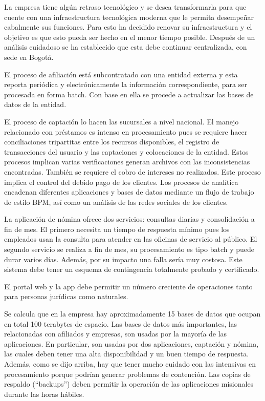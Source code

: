 \documentclass[a4paper]{article}
\begin{document}
La empresa tiene algún retraso tecnológico y se desea transformarla para que cuente con una infraestructura
tecnológica moderna que le permita desempeñar cabalmente sus funciones. Para esto ha decidido renovar su
infraestructura y el objetivo es que esto pueda ser hecho en el menor tiempo posible. Después de un análisis
cuidadoso se ha establecido que esta debe continuar centralizada, con sede en Bogotá.

El proceso de afiliación está subcontratado con una entidad externa y esta reporta periódica y electrónicamente la
información correspondiente, para ser procesada en forma batch. Con base en ella se procede a actualizar las bases
de datos de la entidad.

El proceso de captación lo hacen las sucursales a nivel nacional. El manejo relacionado con préstamos es intenso en
procesamiento pues se requiere hacer conciliaciones tripartitas entre los recursos disponibles, el registro de
transacciones del usuario y las captaciones y colocaciones de la entidad. Estos procesos implican varias verificaciones generan archivos con las inconsistencias encontradas. También se requiere el cobro de intereses no
realizados. Este proceso implica el control del debido pago de los clientes.
Los procesos de analítica encadenan diferentes aplicaciones y bases de datos mediante un flujo de trabajo de estilo
BPM, así como un análisis de las redes sociales de los clientes.

La aplicación de nómina ofrece dos servicios: consultas diarias y consolidación a fin de mes. El primero necesita un
tiempo de respuesta mínimo pues los empleados usan la consulta para atender en las oficinas de servicio al público.
El segundo servicio se realiza a fin de mes, su procesamiento es tipo batch y puede durar varios días. Además, por
su impacto una falla sería muy costosa. Este sistema debe tener un esquema de contingencia totalmente probado
y certificado.

El portal web y la app debe permitir un número creciente de operaciones tanto para personas jurídicas como
naturales.

Se calcula que en la empresa hay aproximadamente 15 bases de datos que ocupan en total 100 terabytes de
espacio. Las bases de datos más importantes, las relacionadas con afiliados y empresas, son usadas por la mayoría
de las aplicaciones. En particular, son usadas por dos aplicaciones, captación y nómina, las cuales deben tener una
alta disponibilidad y un buen tiempo de respuesta. Además, como se dijo arriba, hay que tener mucho cuidado con
las intensivas en procesamiento porque podrían generar problemas de contención.
Las copias de respaldo (“backups”) deben permitir la operación de las aplicaciones misionales durante las horas
hábiles.
\end{document}
